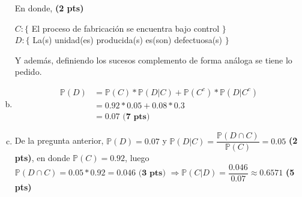\begin{solution}
\begin{enumerate}[a)]
\begin{center}
\end{center}
En donde, \textbf{(2 pts)}\\
\begin{center}
$C:\{$ El proceso de fabricación se encuentra bajo control $\}$\\
$D:\{$ La(s) unidad(es) producida(s) es(son) defectuosa(s) $\}$
\end{center}
Y además, definiendo los sucesos complemento de forma análoga se tiene lo pedido.
\newpage
\item \begin{align*}
\mathbb{P}(D)&=\mathbb{P}(C)*\mathbb{P}(D|C)+\mathbb{P}(C^c)*\mathbb{P}(D|C^c)\\
&=0.92*0.05+0.08*0.3\\
&=0.07 \textbf{ (7 pts)}
\end{align*}
\item De la pregunta anterior, $\mathbb{P}(D)=0.07$ y $\mathbb{P}(D|C)=\dfrac{\mathbb{P}(D\cap C)}{\mathbb{P}(C)}=0.05$ \textbf{(2 pts)}, en donde $\mathbb{P}(C)=0.92$, luego $\mathbb{P}(D\cap C)=0.05*0.92=0.046 \textbf{ (3 pts) }\Rightarrow \mathbb{P}(C|D)=\dfrac{0.046}{0.07}\approx 0.6571$ \textbf{(5 pts)}
\end{enumerate}
\end{solution}